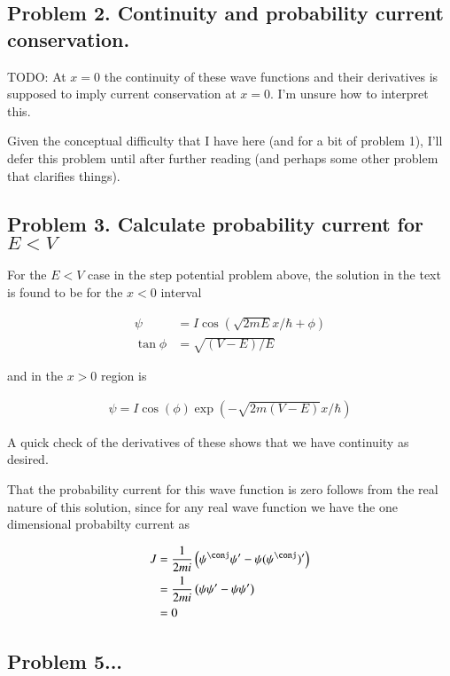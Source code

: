 \documentclass{article}
\begin{document}
\subsection{ Problem 2.  Continuity and probability current conservation. }

TODO:
At $x=0$ the continuity of these wave functions and their derivatives 
is supposed to imply current conservation at $x=0$.  I'm unsure how to
interpret this.

Given the conceptual difficulty that I have here (and for a bit of problem 1),
I'll defer this problem
until after further reading (and perhaps
some other problem that clarifies things).

\subsection{ Problem 3.  Calculate probability current for $E<V$ }

For the $E<V$ case in the step potential problem above, the solution in the 
text is found to be for the $x<0$ interval

\begin{align*}
\psi &= I \cos\left( \sqrt{2mE} x/\hbar + \phi \right) \\
\tan\phi &= \sqrt{(V-E)/E}
\end{align*}

and in the $x>0$ region is

\begin{align*}
\psi = I \cos\left( \phi \right) \exp\left( -\sqrt{2m(V-E)} x/\hbar \right)
\end{align*}

A quick check of the derivatives of these shows that we have continuity as desired.

That the probability current for this wave function is zero follows from the real nature of this solution, since for any real
wave function we have the one dimensional probabilty current as

\begin{align*}
J 
&= \inv{2mi}\left( \psi^\conj \psi' - \psi (\psi^\conj)' \right) \\
&= \inv{2mi}\left( \psi \psi' - \psi \psi' \right) \\
&= 0
\end{align*}


\subsection{ Problem 5... }



\end{document}
